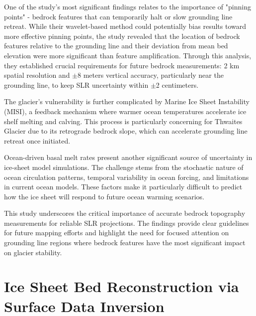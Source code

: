 One of the study's most significant findings relates to the importance of "pinning points" - bedrock features that can temporarily halt or slow grounding line retreat. While their wavelet-based method could potentially bias results toward more effective pinning points, the study revealed that the location of bedrock features relative to the grounding line and their deviation from mean bed elevation were more significant than feature amplification\cite{Castleman_2022}. Through this analysis, they established crucial requirements for future bedrock measurements: 2 km spatial resolution and $\pm$8 meters vertical accuracy, particularly near the grounding line, to keep SLR uncertainty within $\pm$2 centimeters.

The glacier's vulnerability is further complicated by Marine Ice Sheet Instability (MISI)\cite{Castleman_2022}, a feedback mechanism where warmer ocean temperatures accelerate ice shelf melting and calving. This process is particularly concerning for Thwaites Glacier due to its retrograde bedrock slope\cite{Castleman_2022}, which can accelerate grounding line retreat once initiated.%


Ocean-driven basal melt rates present another significant source of uncertainty in ice-sheet model simulations. The challenge stems from the stochastic nature of ocean circulation patterns, temporal variability in ocean forcing, and limitations in current ocean models\cite{Castleman_2022}. These factors make it particularly difficult to predict how the ice sheet will respond to future ocean warming scenarios\cite{Castleman_2022}.

This study underscores the critical importance of accurate bedrock topography measurements for reliable SLR projections. The findings provide clear guidelines for future mapping efforts and highlight the need for focused attention on grounding line regions where bedrock features have the most significant impact on glacier stability.

\section{Ice Sheet Bed Reconstruction via  Surface Data Inversion}\label{Ockenden_2022}

